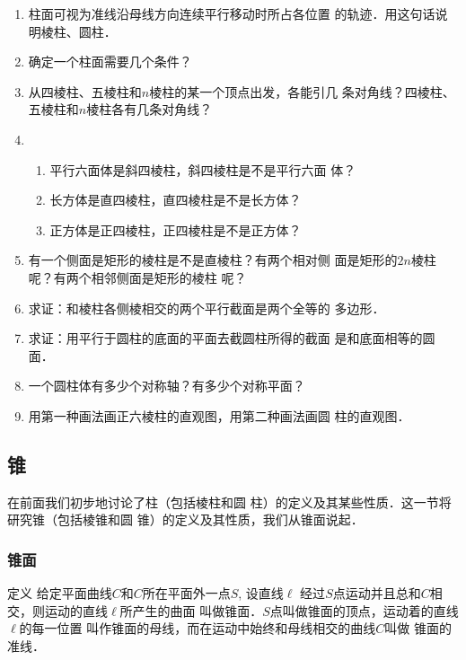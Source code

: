\begin{ex}
\begin{enumerate}
    \item 柱面可视为准线沿母线方向连续平行移动时所占各位置
    的轨迹．用这句话说明棱柱、圆柱．
    \item 确定一个柱面需要几个条件？
    \item 从四棱柱、五棱柱和$n$棱柱的某一个顶点出发，各能引几
    条对角线？四棱柱、五棱柱和$n$棱柱各有几条对角线？
    \item \begin{enumerate}
    \item 平行六面体是斜四棱柱，斜四棱柱是不是平行六面
体？
\item 长方体是直四棱柱，直四棱柱是不是长方体？
\item 正方体是正四棱柱，正四棱柱是不是正方体？
    \end{enumerate} 

\item 有一个侧面是矩形的棱柱是不是直棱柱？有两个相对侧
面是矩形的$2n$棱柱呢？有两个相邻侧面是矩形的棱柱
呢？
\item 求证：和棱柱各侧棱相交的两个平行截面是两个全等的
多边形．
\item 求证：用平行于圆柱的底面的平面去截圆柱所得的截面
是和底面相等的圆面．
\item 一个圆柱体有多少个对称轴？有多少个对称平面？
\item 用第一种画法画正六棱柱的直观图，用第二种画法画圆
柱的直观图．
\end{enumerate}  
\end{ex}

\subsection{锥}

在前面我们初步地讨论了柱（包括棱柱和圆
柱）的定义及其某些性质．这一节将研究锥（包括棱锥和圆
锥）的定义及其性质，我们从锥面说起．

\subsubsection{锥面}

\begin{blk}
    {定义} 给定平面曲线$C$和$C$所在平面外一点$S$, 设直线$\ell$
经过$S$点运动并且总和$C$相交，则运动的直线$\ell$所产生的曲面
叫做锥面．$S$点叫做锥面的顶点，运动着的直线$\ell$的每一位置
叫作锥面的母线，而在运动中始终和母线相交的曲线$C$叫做
锥面的准线．
\end{blk}

